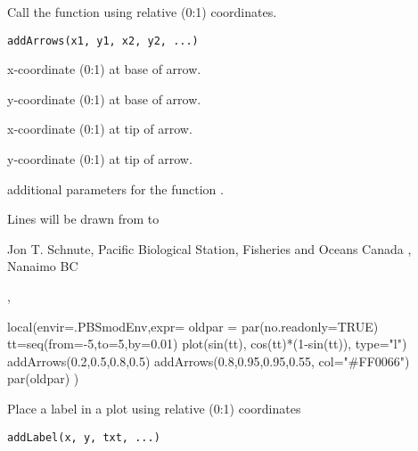 \documentclass[letterpaper]{book}
\begin{document}
%
\begin{Description}\relax
Call the  function using relative (0:1) coordinates.
\end{Description}
%
\begin{Usage}
\begin{verbatim}
addArrows(x1, y1, x2, y2, ...)
\end{verbatim}
\end{Usage}
%
\begin{Arguments}
\begin{ldescription}
\item[\code{x1}]  x-coordinate (0:1) at base of arrow.
\item[\code{y1}]  y-coordinate (0:1) at base of arrow.
\item[\code{x2}]  x-coordinate (0:1) at tip of arrow.
\item[\code{y2}]  y-coordinate (0:1) at tip of arrow.
\item[\code{...}]  additional parameters for the function .
\end{ldescription}
\end{Arguments}
%
\begin{Details}\relax
Lines will be drawn from  to 
\end{Details}
%
\begin{Author}\relax
Jon T. Schnute, Pacific Biological Station, Fisheries and Oceans Canada , Nanaimo BC
\end{Author}
%
\begin{SeeAlso}\relax
{}, 
\end{SeeAlso}
%
\begin{Examples}
\begin{ExampleCode}
local(envir=.PBSmodEnv,expr={
  oldpar = par(no.readonly=TRUE)
  tt=seq(from=-5,to=5,by=0.01)
  plot(sin(tt), cos(tt)*(1-sin(tt)), type="l")
  addArrows(0.2,0.5,0.8,0.5)
  addArrows(0.8,0.95,0.95,0.55, col="#FF0066")
  par(oldpar)
})
\end{ExampleCode}
\end{Examples}
%
\begin{Description}\relax
Place a label in a plot using relative (0:1) coordinates
\end{Description}
%
\begin{Usage}
\begin{verbatim}
addLabel(x, y, txt, ...)
\end{verbatim}
\end{Usage}
\end{document}
